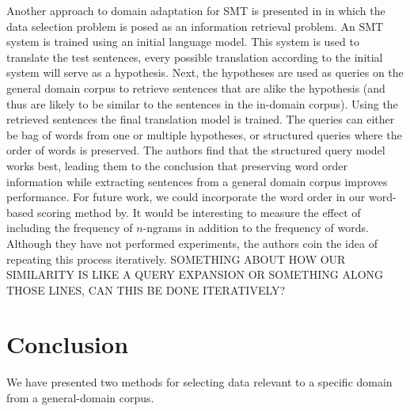 \documentclass[11pt]{article}
\begin{document}
Another approach to domain adaptation for SMT is presented in \cite{query} in which the data selection problem is posed as an information retrieval problem. An SMT system is trained using an initial language model. This system is used to translate the test sentences, every possible translation according to the initial system will serve as a hypothesis. Next, the hypotheses are used as queries on the general domain corpus to retrieve sentences that are alike the hypothesis (and thus are likely to be similar to the sentences in the in-domain corpus). Using the retrieved sentences the final translation model is trained. The queries can either be bag of words from one or multiple hypotheses, or structured queries where the order of words is preserved. The authors find that the structured query model works best, leading them to the conclusion that preserving word order information while extracting sentences from a general domain corpus improves performance. For future work, we could incorporate the word order in our word-based scoring method by. It would be interesting to measure the effect of including the frequency of $n$-ngrams in addition to the frequency of words. Although they have not performed experiments, the authors coin the idea of repeating this process iteratively. SOMETHING ABOUT HOW OUR SIMILARITY IS LIKE A QUERY EXPANSION OR SOMETHING ALONG THOSE LINES, CAN THIS BE DONE ITERATIVELY?


\section{Conclusion}
\label{sec:conclusion}
We have presented two methods for selecting data relevant to a specific domain from a general-domain corpus.
\end{document}

